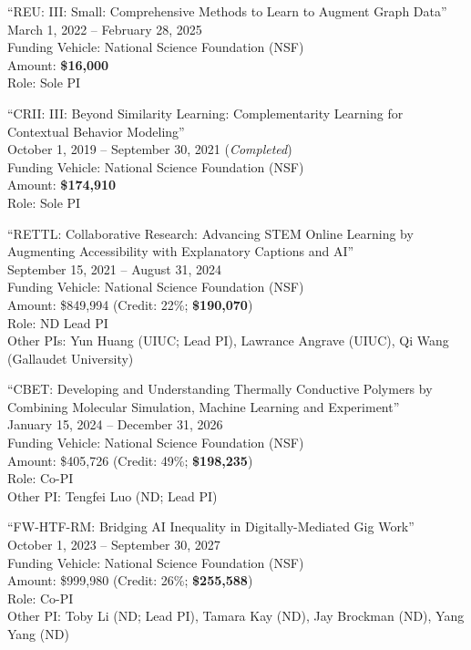 \documentclass[10pt]{article}
\newenvironment{myindentpar}[1]%
{\begin{list}{}%
         {\setlength{\leftmargin}{#1}}%
         \item[]%
}
{\end{list}}
\newcounter{list}
\begin{document}
\begin{myindentpar}{0.75cm}
\hspace{-0.75cm}``REU: III: Small: Comprehensive Methods to Learn to Augment Graph Data'' \\
March 1, 2022 -- February 28, 2025 \\
Funding Vehicle: National Science Foundation (NSF) \\
Amount: \textbf{\$16,000} \\
Role: {Sole PI}

\hspace{-0.75cm}``CRII: III: Beyond Similarity Learning: Complementarity Learning for Contextual Behavior Modeling'' \\
October 1, 2019 -- September 30, 2021 (\emph{Completed}) \\
Funding Vehicle: National Science Foundation (NSF) \\
Amount: \textbf{\$174,910} \\
Role: {Sole PI}

\hspace{-0.75cm}``RETTL: Collaborative Research: Advancing STEM Online Learning by Augmenting Accessibility with Explanatory Captions and AI'' \\
September 15, 2021 -- August 31, 2024 \\
Funding Vehicle: National Science Foundation (NSF) \\
Amount: \$849,994 (Credit: 22\%; \textbf{\$190,070}) \\
Role: {ND Lead PI} \\
Other PIs: Yun Huang (UIUC; Lead PI), Lawrance Angrave (UIUC), Qi Wang (Gallaudet University)

\hspace{-0.75cm}``CBET: Developing and Understanding Thermally Conductive Polymers by Combining Molecular Simulation, Machine Learning and Experiment'' \\
January 15, 2024 -- December 31, 2026 \\
Funding Vehicle: National Science Foundation (NSF) \\
Amount: \$405,726 (Credit: 49\%; \textbf{\$198,235}) \\
Role: {Co-PI} \\
Other PI: Tengfei Luo (ND; Lead PI)

\hspace{-0.75cm}``FW-HTF-RM: Bridging AI Inequality in Digitally-Mediated Gig Work'' \\
October 1, 2023 -- September 30, 2027 \\
Funding Vehicle: National Science Foundation (NSF) \\
Amount: \$999,980 (Credit: 26\%; \textbf{\$255,588}) \\
Role: {Co-PI} \\
Other PI: Toby Li (ND; Lead PI), Tamara Kay (ND), Jay Brockman (ND), Yang Yang (ND)


\end{myindentpar}
\end{document}
